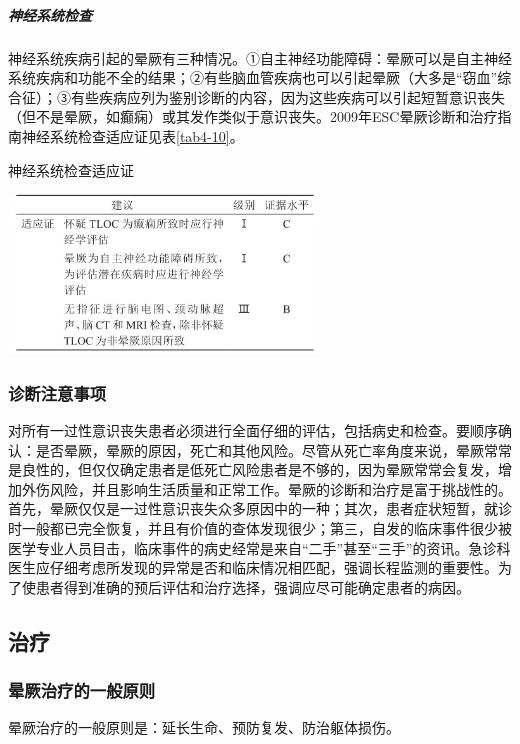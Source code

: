 \subparagraph{神经系统检查}

神经系统疾病引起的晕厥有三种情况。①自主神经功能障碍：晕厥可以是自主神经系统疾病和功能不全的结果；②有些脑血管疾病也可以引起晕厥（大多是“窃血”综合征）；③有些疾病应列为鉴别诊断的内容，因为这些疾病可以引起短暂意识丧失（但不是晕厥，如癫痫）或其发作类似于意识丧失。2009年ESC晕厥诊断和治疗指南神经系统检查适应证见表\ref{tab4-10}。

\begin{table}[htbp]
\centering
\caption{神经系统检查适应证}
\label{tab4-10}
\includegraphics[width=3.25in,height=1.66667in]{./images/Image00027.jpg}
\end{table}

\subsubsection{诊断注意事项}

对所有一过性意识丧失患者必须进行全面仔细的评估，包括病史和检查。要顺序确认：是否晕厥，晕厥的原因，死亡和其他风险。尽管从死亡率角度来说，晕厥常常是良性的，但仅仅确定患者是低死亡风险患者是不够的，因为晕厥常常会复发，增加外伤风险，并且影响生活质量和正常工作。晕厥的诊断和治疗是富于挑战性的。首先，晕厥仅仅是一过性意识丧失众多原因中的一种；其次，患者症状短暂，就诊时一般都已完全恢复，并且有价值的查体发现很少；第三，自发的临床事件很少被医学专业人员目击，临床事件的病史经常是来自“二手”甚至“三手”的资讯。急诊科医生应仔细考虑所发现的异常是否和临床情况相匹配，强调长程监测的重要性。为了使患者得到准确的预后评估和治疗选择，强调应尽可能确定患者的病因。

\subsection{治疗}

\subsubsection{晕厥治疗的一般原则}

晕厥治疗的一般原则是：延长生命、预防复发、防治躯体损伤。

